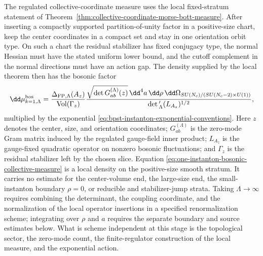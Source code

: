 The regulated collective-coordinate measure uses the local fixed-stratum
statement of
Theorem~\ref{thm:collective-coordinate-morse-bott-measure}.  After inserting a
compactly supported partition-of-unity factor in a positive-size chart, keep the
center coordinates in a compact set and stay in one orientation orbit type.  On
such a chart the residual stabilizer has fixed conjugacy type, the normal
Hessian must have the stated uniform lower bound, and the cutoff complement in
the normal directions must have an action gap.  The density supplied by the
local theorem then has the bosonic factor
\begin{equation}
  \dd\mu_{k=1,\Lambda}^{\rm bos}
  =
  \frac{\Delta_{\rm FP,\Lambda}(A_z)}
       {\operatorname{Vol}(\Gamma_z)}
  \frac{\sqrt{\det G^{(\Lambda)}_{ab}(z)}\,
        \dd^4a\,\dd\rho\,
        \dd\Omega_{SU(N_c)/(SU(N_c-2)\times U(1))}}
       {\det{}'_\Lambda(L_{A_z})^{1/2}},
  \label{eq:one-instanton-bosonic-collective-measure}
\end{equation}
multiplied by the exponential
\eqref{eq:bpst-instanton-exponential-conventions}.  Here \(z\) denotes the
center, size, and orientation coordinates; \(G^{(\Lambda)}_{ab}\) is the
zero-mode Gram matrix induced by the regulated gauge-field inner product;
\(L_{A_z}\) is the gauge-fixed quadratic operator on nonzero bosonic
fluctuations; and \(\Gamma_z\) is the residual stabilizer left by the chosen
slice.  Equation
\eqref{eq:one-instanton-bosonic-collective-measure} is a local density on the
positive-size smooth stratum.  It carries no estimate for the center-volume
end, the large-size end, the small-instanton boundary \(\rho=0\), or reducible
and stabilizer-jump strata.  Taking \(\Lambda\to\infty\) requires combining the
determinant, the coupling coordinate, and the normalization of the local
operator insertions in a specified renormalization scheme; integrating over
\(\rho\) and \(a\) requires the separate boundary and source estimates below.
What is scheme independent at this stage is the topological sector, the
zero-mode count, the finite-regulator construction of the local measure, and
the exponential action.

